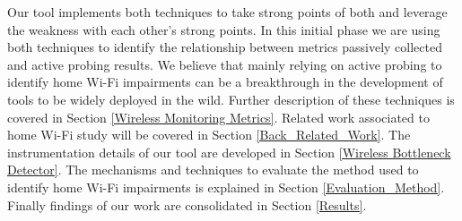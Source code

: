 Our tool implements both techniques to take strong points of both and leverage the weakness with each other's strong points. In this initial phase we are using both techniques to identify the relationship  between metrics passively collected and active probing results. We believe that mainly relying on active probing to identify home Wi-Fi impairments can be a breakthrough in the development of tools to be widely deployed in the wild. Further description of these techniques is covered in Section \ref{Wireless Monitoring Metrics}. Related work associated to home Wi-Fi study will be covered in Section \ref{Back_Related_Work}. The instrumentation details of our tool are developed in Section \ref{Wireless Bottleneck Detector}. The mechanisms and techniques to evaluate the method used to identify home Wi-Fi impairments is explained in Section \ref{Evaluation_Method}. Finally findings of our work are consolidated in Section \ref{Results}.
\newpage